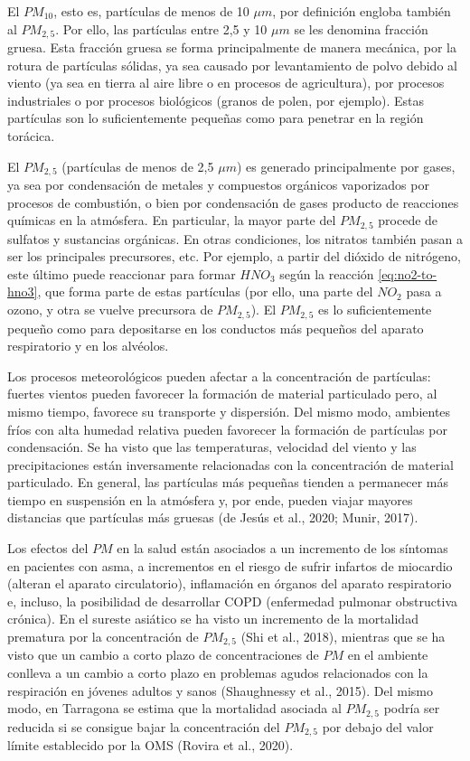 \documentclass[12pt]{article}
\begin{document}
El $PM_{10}$, esto es, partículas de menos de 10 $\mu m$, por definición engloba también al $PM_{2,5}$. Por ello, las partículas entre 2,5 y 10 $\mu m$ se les denomina fracción gruesa. Esta fracción gruesa se forma principalmente de manera mecánica, por la rotura de partículas sólidas, ya sea causado por levantamiento de polvo debido al viento (ya sea en tierra al aire libre o en procesos de agricultura), por procesos industriales o por procesos biológicos (granos de polen, por ejemplo). Estas partículas son lo suficientemente pequeñas como para penetrar en la región torácica.

El $PM_{2,5}$ (partículas de menos de 2,5 $\mu m$) es generado principalmente por gases, ya sea por condensación de metales y compuestos orgánicos vaporizados por procesos de combustión, o bien por condensación de gases producto de reacciones químicas en la atmósfera. En particular, la mayor parte del $PM_{2,5}$ procede de sulfatos y sustancias orgánicas. En otras condiciones, los nitratos también pasan a ser los principales precursores, etc. Por ejemplo, a partir del dióxido de nitrógeno, este último puede reaccionar para formar $HNO_{3}$ según la reacción \ref{eq:no2-to-hno3}, que forma parte de estas partículas (por ello, una parte del $NO_{2}$ pasa a ozono, y otra se vuelve precursora de $PM_{2,5}$). El $PM_{2,5}$ es lo suficientemente pequeño como para depositarse en los conductos más pequeños del aparato respiratorio y en los alvéolos.

Los procesos meteorológicos pueden afectar a la concentración de partículas: fuertes vientos pueden favorecer la formación de material particulado pero, al mismo tiempo, favorece su transporte y dispersión. Del mismo modo, ambientes fríos con alta humedad relativa pueden favorecer la formación de partículas por condensación. Se ha visto que las temperaturas, velocidad del viento y las precipitaciones están inversamente relacionadas con la concentración de material particulado. En general, las partículas más pequeñas tienden a permanecer más tiempo en suspensión en la atmósfera y, por ende, pueden viajar mayores distancias que partículas más gruesas (de Jesús et al., 2020; Munir, 2017).

Los efectos del $PM$ en la salud están asociados a un incremento de los síntomas en pacientes con asma, a incrementos en el riesgo de sufrir infartos de miocardio (alteran el aparato circulatorio), inflamación en órganos del aparato respiratorio e, incluso, la posibilidad de desarrollar COPD (enfermedad pulmonar obstructiva crónica). En el sureste asiático se ha visto un incremento de la mortalidad prematura por la concentración de $PM_{2,5}$ (Shi et al., 2018), mientras que se ha visto que un cambio a corto plazo de concentraciones de $PM$ en el ambiente conlleva a un cambio a corto plazo en problemas agudos relacionados con la respiración en jóvenes adultos y sanos (Shaughnessy et al., 2015). Del mismo modo, en Tarragona se estima que la mortalidad asociada al $PM_{2,5}$ podría ser reducida si se consigue bajar la concentración del $PM_{2,5}$ por debajo del valor límite establecido por la OMS (Rovira et al., 2020).
\end{document}

